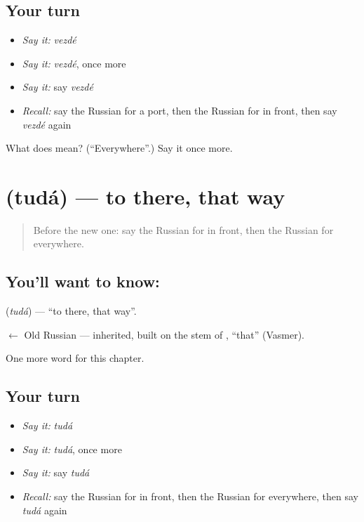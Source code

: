 \subsection*{Your turn}
\begin{itemize}
\raggedright
  \item \emph{Say it:} \emph{vezdé}
  \item \emph{Say it:} \emph{vezdé}, once more
  \item \emph{Say it:} say \emph{vezdé}
  \item \emph{Recall:} say the Russian for a port, then the Russian for in front, then say \emph{vezdé} again
\end{itemize}

\begin{tcolorbox}[breakable,colback=teal!4,colframe=teal!35!black,title={Before you move on}]
What does  mean? (\textquotedblleft{}Everywhere\textquotedblright{}.) Say it once more.
\end{tcolorbox}
\section[\texorpdfstring{\ru{туда} (tudá)}{туда (tudá)}]{ (tudá) — to there, that way}

\label{lesson:RU-C184-tuda}



\begin{quote}
Before the new one: say the Russian for in front, then the Russian for everywhere.
\end{quote}

\subsection*{You'll want to know: }
\textbf{} (\emph{tudá}) — \textquotedblleft{}to there, that way\textquotedblright{}.

\begin{cousinweb}
\textbf{} $\leftarrow$ Old Russian \emph{} — inherited, built on the stem of \emph{}, \textquotedblleft{}that\textquotedblright{} (Vasmer).
\end{cousinweb}

\begin{grammarlens}[title={What you've built}]
One more word for this chapter.
\end{grammarlens}

\subsection*{Your turn}
\begin{itemize}
\raggedright
  \item \emph{Say it:} \emph{tudá}
  \item \emph{Say it:} \emph{tudá}, once more
  \item \emph{Say it:} say \emph{tudá}
  \item \emph{Recall:} say the Russian for in front, then the Russian for everywhere, then say \emph{tudá} again
\end{itemize}

